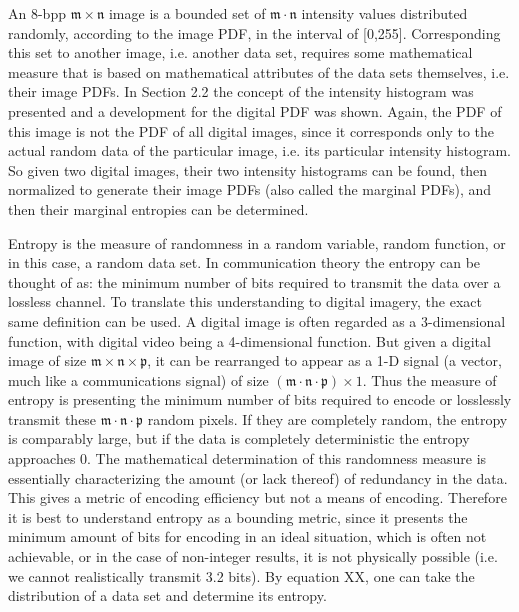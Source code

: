 An 8-bpp $\mathfrak{m} \times \mathfrak{n}$ image is a bounded set of $\mathfrak{m} \cdot \mathfrak{n}$ intensity values distributed randomly, according to the image PDF, in the interval of [0,255]. Corresponding this set to another image, i.e. another data set, requires some mathematical measure that is based on mathematical attributes of the data sets themselves, i.e. their image PDFs. In Section 2.2 the concept of the intensity histogram was presented and a development for the digital PDF was shown. Again, the PDF of this image is not the PDF of all digital images, since it corresponds only to the actual random data of the particular image, i.e. its particular intensity histogram. So given two digital images, their two intensity histograms can be found, then normalized to generate their image PDFs (also called the marginal PDFs), and then their marginal entropies can be determined.

Entropy is the measure of randomness in a random variable, random function, or in this case, a random data set. In communication theory the entropy can be thought of as: the minimum number of bits required to transmit the data over a lossless channel. To translate this understanding to digital imagery, the exact same definition can be used. A digital image is often regarded as a 3-dimensional function, with digital video being a 4-dimensional function. But given a digital image of size $\mathfrak{m} \times \mathfrak{n} \times \mathfrak{p}$, it can be rearranged to appear as a 1-D signal (a vector, much like a communications signal) of size $(\mathfrak{m} \cdot \mathfrak{n} \cdot \mathfrak{p}) \times 1$. Thus the measure of entropy is presenting the minimum number of bits required to encode or losslessly transmit these $\mathfrak{m} \cdot \mathfrak{n} \cdot \mathfrak{p}$ random pixels. If they are completely random, the entropy is comparably large, but if the data is completely deterministic the entropy approaches 0. The mathematical determination of this randomness measure is essentially characterizing the amount (or lack thereof) of redundancy in the data. This gives a metric of encoding efficiency but not a means of encoding. Therefore it is best to understand entropy as a bounding metric, since it presents the minimum amount of bits for encoding in an ideal situation, which is often not achievable, or in the case of non-integer results, it is not physically possible (i.e. we cannot realistically transmit 3.2 bits). By equation XX, one can take the distribution of a data set and determine its entropy.


